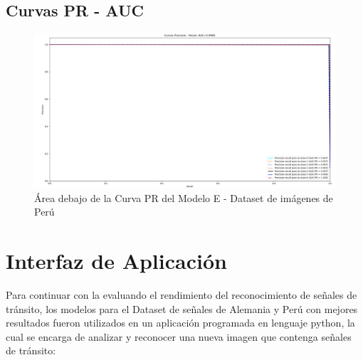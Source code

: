 		\subsection{Curvas PR - AUC}  
					\begin{figure}[H]
						\includegraphics[width=1\textwidth, height=\textheight,keepaspectratio]{images/desarrollo/testResults/peru/PR_curve_modelE} 
						\begin{center}
						\caption{\small{Área debajo de la Curva PR del Modelo E - Dataset de imágenes de Perú}}
						\vspace{-1em}
						{\small{\fontsize{10}{16.8}\selectfont {Fuente propia}}}
						\end{center}
						\vspace{-1.5em}
					\end{figure}

	\section{Interfaz de Aplicación}
		
		Para continuar con la evaluando el rendimiento del reconocimiento de señales de tránsito, los modelos para el Dataset de señales de Alemania y Perú con mejores resultados fueron utilizados en un aplicación programada en lenguaje python, la cual se encarga de analizar y reconocer una nueva imagen que contenga señales de tránsito:

